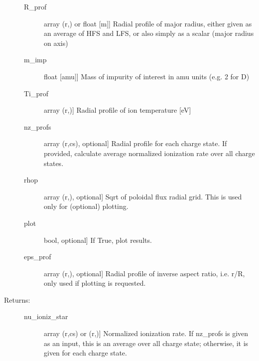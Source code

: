 \documentclass[letterpaper,10pt,english]{sphinxmanual}
\begin{document}
\begin{fulllineitems}
\begin{description}
\begin{description}
\item[{R\_prof}] \leavevmode{[}array (r,) or float {[}m{]}{]}
Radial profile of major radius, either given as an average of HFS and LFS, or also
simply as a scalar (major radius on axis)

\item[{m\_imp}] \leavevmode{[}float {[}amu{]}{]}
Mass of impurity of interest in amu units (e.g. 2 for D)

\item[{Ti\_prof}] \leavevmode{[}array (r,){]}
Radial profile of ion temperature {[}eV{]}

\item[{nz\_profs}] \leavevmode{[}array (r,cs), optional{]}
Radial profile for each charge state. If provided, calculate average normalized 
ionization rate over all charge states.

\item[{rhop}] \leavevmode{[}array (r,), optional{]}
Sqrt of poloidal flux radial grid. This is used only for (optional) plotting.

\item[{plot}] \leavevmode{[}bool, optional{]}
If True, plot results.

\item[{eps\_prof}] \leavevmode{[}array (r,), optional{]}
Radial profile of inverse aspect ratio, i.e. r/R, only used if plotting is requested.

\end{description}

\item[{Returns:}] \leavevmode\begin{description}
\item[{nu\_ioniz\_star}] \leavevmode{[}array (r,cs) or (r,){]}
Normalized ionization rate. If nz\_profs is given as an input, this is an average over
all charge state; otherwise, it is given for each charge state.

\end{description}

\end{description}

\end{fulllineitems}

\end{document}
